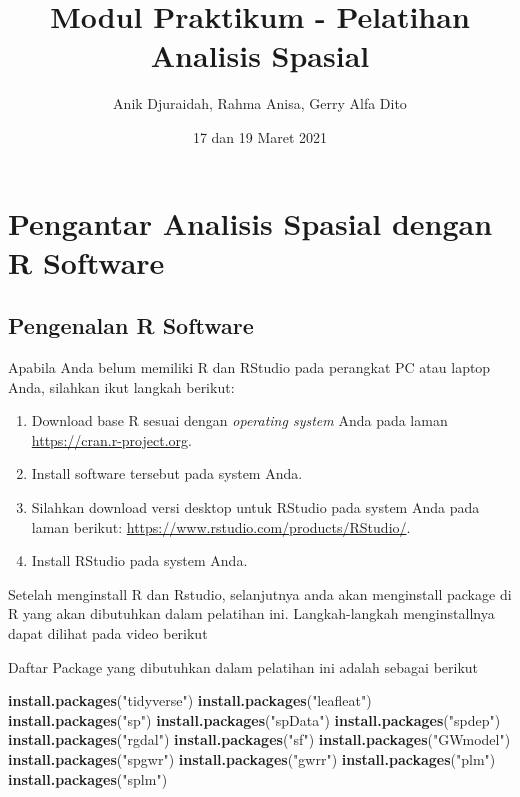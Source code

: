 \documentclass[
]{book}
\title{Modul Praktikum - Pelatihan Analisis Spasial}
\author{Anik Djuraidah, Rahma Anisa, Gerry Alfa Dito}
\date{17 dan 19 Maret 2021}
\newenvironment{Shaded}{\begin{snugshade}}{\end{snugshade}}
\newcommand{\KeywordTok}[1]{\textcolor[rgb]{0.13,0.29,0.53}{\textbf{#1}}}
\newcommand{\NormalTok}[1]{#1}
\newcommand{\StringTok}[1]{\textcolor[rgb]{0.31,0.60,0.02}{#1}}
\begin{document}
\maketitle

{
\setcounter{tocdepth}{1}
\tableofcontents
}
\hypertarget{pengantar-analisis-spasial-dengan-r-software}{%
\chapter{Pengantar Analisis Spasial dengan R Software}\label{pengantar-analisis-spasial-dengan-r-software}}

\hypertarget{pengenalan-r-software}{%
\section{Pengenalan R Software}\label{pengenalan-r-software}}

Apabila Anda belum memiliki R dan RStudio pada perangkat PC atau laptop Anda, silahkan ikut langkah berikut:

\begin{enumerate}
\def\labelenumi{\arabic{enumi}.}
\item
  Download base R sesuai dengan \emph{operating system} Anda pada laman \url{https://cran.r-project.org}.
\item
  Install software tersebut pada system Anda.
\item
  Silahkan download versi desktop untuk RStudio pada system Anda pada laman berikut: \url{https://www.rstudio.com/products/RStudio/}.
\item
  Install RStudio pada system Anda.
\end{enumerate}

Setelah menginstall R dan Rstudio, selanjutnya anda akan menginstall package di R yang akan dibutuhkan dalam pelatihan ini. Langkah-langkah menginstallnya dapat dilihat pada video berikut

Daftar Package yang dibutuhkan dalam pelatihan ini adalah sebagai berikut

\begin{Shaded}
\begin{Highlighting}[]
\KeywordTok{install.packages}\NormalTok{(}\StringTok{"tidyverse"}\NormalTok{)}
\KeywordTok{install.packages}\NormalTok{(}\StringTok{"leafleat"}\NormalTok{)}
\KeywordTok{install.packages}\NormalTok{(}\StringTok{"sp"}\NormalTok{)}
\KeywordTok{install.packages}\NormalTok{(}\StringTok{"spData"}\NormalTok{)}
\KeywordTok{install.packages}\NormalTok{(}\StringTok{"spdep"}\NormalTok{)}
\KeywordTok{install.packages}\NormalTok{(}\StringTok{"rgdal"}\NormalTok{)}
\KeywordTok{install.packages}\NormalTok{(}\StringTok{"sf"}\NormalTok{)}
\KeywordTok{install.packages}\NormalTok{(}\StringTok{"GWmodel"}\NormalTok{)}
\KeywordTok{install.packages}\NormalTok{(}\StringTok{"spgwr"}\NormalTok{)}
\KeywordTok{install.packages}\NormalTok{(}\StringTok{"gwrr"}\NormalTok{)}
\KeywordTok{install.packages}\NormalTok{(}\StringTok{"plm"}\NormalTok{)}
\KeywordTok{install.packages}\NormalTok{(}\StringTok{"splm"}\NormalTok{)}
\end{Highlighting}
\end{Shaded}
\end{document}
